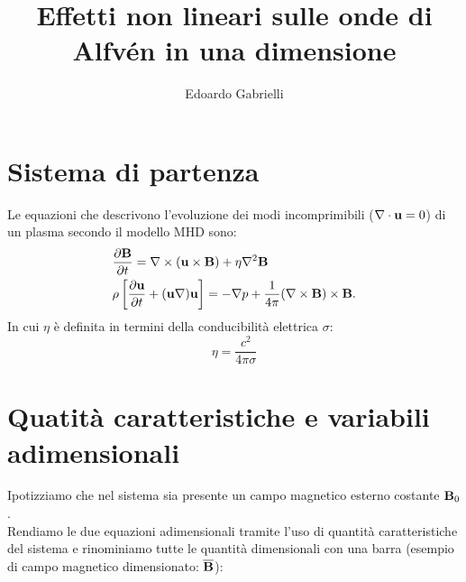 
\title{Effetti non lineari sulle onde di Alfvén in una dimensione}
\author{Edoardo Gabrielli}


\maketitle
\section{Sistema di partenza}
Le equazioni che descrivono l'evoluzione dei modi incomprimibili ($\nabla \cdot \vv{u} = 0$) di un plasma secondo il modello MHD sono:
\begin{align}
     & \pd{\vv{B}} = \nabla \times (\vv{u} \times \vv{B}) + \eta \nabla^2 \vv{B}                                   \\
     & \rho \left[\pd{\vv{u}} + (\vv{u} \nabla)\vv{u}\right] = - \nabla p + \frac{1}{4\pi} (\nabla \times \vv{B} ) \times \vv{B}.
    \label{eq:moto}
\end{align}
In cui $\eta$ è definita in termini della conducibilità elettrica $\sigma$:
\[
    \eta = \frac{c^2}{4\pi\sigma}
\]
\section{Quatità caratteristiche e variabili adimensionali}
Ipotizziamo che nel sistema sia presente un campo magnetico esterno costante $\vv{B}_0$.\\
Rendiamo le due equazioni adimensionali tramite l'uso di quantità caratteristiche del sistema e rinominiamo tutte le quantità dimensionali con una barra (esempio di campo magnetico dimensionato: $\overline{\vv{B}}$):

